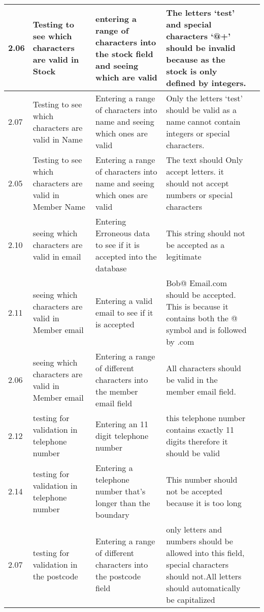 \begin{flushleft}
\begin{longtable}{|p{1cm}|p{2.5cm}|p{2.5cm}|p{2cm}|p{2cm}|}
	\rowcolor{dark-grey}2.06 & Testing to see which characters are valid in Stock & entering a range of characters into the stock field and seeing which are valid  & The letters `test' and special characters `@+' should be invalid because as the stock is only defined by integers. & \\ \hline
	\rowcolor{dark-grey}2.07 & Testing to see which characters are valid in Name & Entering a range of characters into name and seeing which ones are valid  & Only the letters `test' should be valid as a name cannot contain integers or special characters.& \\ \hline
	2.05 & Testing to see which characters are valid in Member Name & Entering a range of characters into name and seeing which ones are valid &  The text should Only accept letters. it should not accept numbers or special characters& \\ \hline
	\rowcolor{dark-grey}2.10 & seeing which characters are valid in email & Entering Erroneous data to see if it is accepted into the database  & This string should not be accepted as a legitimate & \\ \hline
	\rowcolor{dark-grey}2.11 & seeing which characters are valid in Member email & Entering a valid email to see if it is accepted  &  Bob@ Email.com should be accepted. This is because it contains both the @ symbol and is followed by .com & \\ \hline
	\rowcolor{light-grey}2.06 & seeing which characters are valid in Member email & Entering a range of different characters into the member email field &  All characters should be valid in the member email field. & \\ \hline
	\rowcolor{dark-grey}2.12 & testing for validation in telephone number & Entering an 11 digit telephone number & this telephone number contains exactly 11 digits therefore it should be valid &  \\ \hline
	\rowcolor{dark-grey}2.14 & testing for validation in telephone number & Entering a telephone number that's longer than the boundary & This number should not be accepted because it is too long & \\ \hline
	\rowcolor{light-grey}2.07 & testing for validation in the postcode & Entering a range of different characters into the postcode field & only letters and numbers should be allowed into this field, special characters should not.All letters should automatically be capitalized& \\ \hline

\end{longtable}
\end{flushleft}
